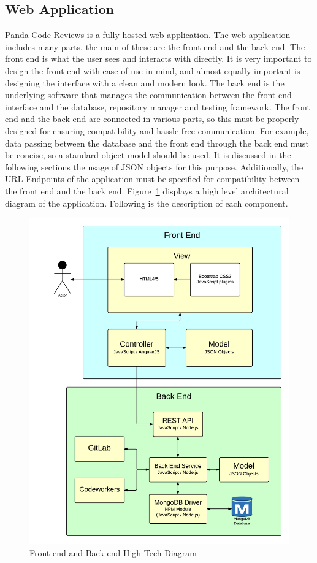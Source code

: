 
\subsection{Web Application}

Panda Code Reviews is a fully hosted web application. The web application
includes many parts, the main of these are the front end and the back end. The
front end is what the user sees and interacts with directly. It is very
important to design the front end with ease of use in mind, and almost equally
important is designing the interface with a clean and modern look. The back end
is the underlying software that manages the communication between the front end
interface and the database, repository manager and testing framework. The front
end and the back end are connected in various parts, so this must be properly
designed for ensuring compatibility and hassle-free communication. For example,
data passing between the database and the front end through the back end must be
concise, so a standard object model should be used. It is discussed in the
following sections the usage of JSON\cite{JSON} objects for this purpose.
Additionally, the URL Endpoints of the application must be specified for
compatibility between the front end and the back end. Figure~\ref{fig:archi}
displays a high level architectural diagram of the application. Following is the
description of each component.

\begin{figure}[H]
    \centering
    \includegraphics[width=\textwidth]{img/archi}
    \caption{Front end and Back end High Tech Diagram\label{fig:archi}}
\end{figure}


